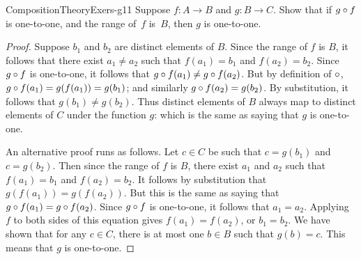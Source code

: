 \begin{example}{CompositionTheoryExers-g11} 
Suppose $f \colon A \to B$ and $g \colon B \to C$. Show that if $g \circ f$ is one-to-one, 
 and the range of~$f$ is~$B$, then $g$ is one-to-one. 

 \begin{proof}
Suppose $b_1$ and $b_2$ are distinct elements of $B$.  Since the range of $f$ is $B$, it follows that there exist $a_1 \neq a_2$ such that $f(a_1) = b_1$ and $f(a_2) = b_2$.  Since $g \circ f$ is one-to-one, it follows that $g \circ f(a_1) \neq g \circ f(a_2)$. But by definition of $\circ$, $g \circ f(a_1) = g(f(a_1)) = g(b_1)$; and similarly $g \circ f(a_2) =  g(b_2)$. By substitution, it follows that  $g(b_1) \neq g(b_2)$. Thus distinct elements of $B$ always map to distinct elements of $C$ under the function $g$: which is the same as saying that $g$ is one-to-one. 

An alternative proof runs as follows. Let $c \in C$ be such that $c =g(b_1)$  and $c= g(b_2)$. Then since the range of $f$ is $B$, there exist $a_1$ and  $a_2$ such that $f(a_1) = b_1$ and $f(a_2) = b_2$. It follows  by substitution that  $g(f(a_1)) = g(f(a_2))$. But this is the same as saying that $g \circ f(a_1) = g \circ f(a_2)$. Since  $g \circ f$ is one-to-one, it follows that $a_1 = a_2$. Applying $f$ to both sides of this equation gives $f(a_1) = f(a_2)$, or $b_1 = b_2$. We have shown that  for any $c \in  C$, there is at most one $b \in B$ such that $g(b) = c$. This means that $g$ is one-to-one.
\end{proof}    
 \end{example}

